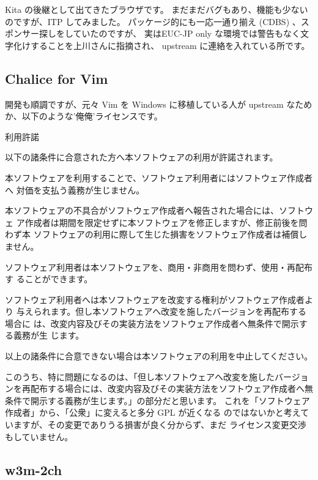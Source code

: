 \documentclass[mingoth,a4paper]{jsarticle}
\begin{document}
Kita の後継として出てきたブラウザです。
まだまだバグもあり、機能も少ないのですが、ITP してみました。
パッケージ的にも一応一通り揃え (CDBS) 、スポンサー探しをしていたのですが、
実はEUC-JP only な環境では警告もなく文字化けすることを上川さんに指摘され、
upstream に連絡を入れている所です。

\subsection{Chalice for Vim}


開発も順調ですが、元々 Vim を Windows に移植している人が upstream なため
か、以下のような'俺俺'ライセンスです。

\begin{commandline}
 
 利用許諾

 以下の諸条件に合意された方へ本ソフトウェアの利用が許諾されます。

 本ソフトウェアを利用することで、ソフトウェア利用者にはソフトウェア作成者へ
 対価を支払う義務が生じません。

 本ソフトウェアの不具合がソフトウェア作成者へ報告された場合には、ソフトウェ
 ア作成者は期間を限定せずに本ソフトウェアを修正しますが、修正前後を問わず本
 ソフトウェアの利用に際して生じた損害をソフトウェア作成者は補償しません。

 ソフトウェア利用者は本ソフトウェアを、商用・非商用を問わず、使用・再配布す
 ることができます。

 ソフトウェア利用者へは本ソフトウェアを改変する権利がソフトウェア作成者より
 与えられます。但し本ソフトウェアへ改変を施したバージョンを再配布する場合に
 は、改変内容及びその実装方法をソフトウェア作成者へ無条件で開示する義務が生
 じます。

 以上の諸条件に合意できない場合は本ソフトウェアの利用を中止してください。
\end{commandline}

このうち、特に問題になるのは、「但し本ソフトウェアへ改変を施したバージョ
ンを再配布する場合には、改変内容及びその実装方法をソフトウェア作成者へ無
条件で開示する義務が生じます。」の部分だと思います。
これを「ソフトウェア作成者」から、「公衆」に変えると多分 GPL が近くなる
のではないかと考えていますが、その変更でありうる損害が良く分からず、まだ
ライセンス変更交渉もしていません。

\subsection{w3m-2ch}
\end{document}

